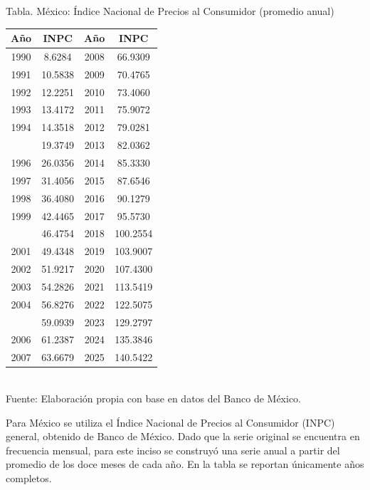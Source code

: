 \documentclass{article}\usepackage[]{graphicx}\usepackage[]{xcolor}
\begin{document}
\begin{center}
Tabla. México: Índice Nacional de Precios al Consumidor (promedio anual)
\end{center}
\begin{center}

\begin{tabular}{cccc}
\toprule
Año & INPC & Año & INPC\\
\midrule
1990 & 8.6284 & 2008 & 66.9309\\
1991 & 10.5838 & 2009 & 70.4765\\
1992 & 12.2251 & 2010 & 73.4060\\
1993 & 13.4172 & 2011 & 75.9072\\
1994 & 14.3518 & 2012 & 79.0281\\
\addlinespace
1995 & 19.3749 & 2013 & 82.0362\\
1996 & 26.0356 & 2014 & 85.3330\\
1997 & 31.4056 & 2015 & 87.6546\\
1998 & 36.4080 & 2016 & 90.1279\\
1999 & 42.4465 & 2017 & 95.5730\\
\addlinespace
2000 & 46.4754 & 2018 & 100.2554\\
2001 & 49.4348 & 2019 & 103.9007\\
2002 & 51.9217 & 2020 & 107.4300\\
2003 & 54.2826 & 2021 & 113.5419\\
2004 & 56.8276 & 2022 & 122.5075\\
\addlinespace
2005 & 59.0939 & 2023 & 129.2797\\
2006 & 61.2387 & 2024 & 135.3846\\
2007 & 63.6679 & 2025 & 140.5422\\
\bottomrule
\end{tabular}
\\[0.3em]
{\footnotesize Fuente: Elaboración propia con base en datos del Banco de México.}
\end{center}


Para México se utiliza el Índice Nacional de Precios al Consumidor (INPC) general, obtenido de Banco de México. Dado que la serie original se encuentra en frecuencia mensual, para este inciso se construyó una serie anual a partir del promedio de los doce meses de cada año. En la tabla se reportan únicamente años completos.
\end{document}
